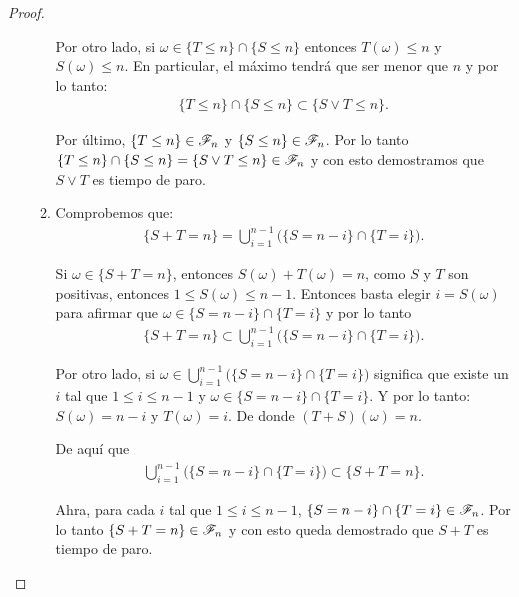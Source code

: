 \begin{proof}
\begin{enumerate}
\begin{enumerate}
							Por otro lado, si $\omega \in \{ T \leq n \} \cap \{ S \leq n\}$ entonces $T(\omega) \leq n$ y $S(\omega) \leq n$.
							En particular, el máximo tendrá que ser menor que $n$ y por lo tanto:
							\begin{align}
		                			\{ T \leq n \} \cap \{ S \leq n\} \subset \{ S \vee T \leq n \}.						
							\end{align}
							
							Por último, $\{ T \leq n \} \in \mathscr{F}_n$ y $\{ S \leq n \} \in \mathscr{F}_n$. Por lo tanto	\\	
							$\{ T \leq n \} \cap \{ S \leq n\} = \{ S \vee T \leq n \} \in \mathscr{F}_n$ y con esto demostramos que 
							$ S \vee T$ es tiempo de paro.\\
							
						\item
							Comprobemos que:
							\begin{align}
								\{ S + T = n \} = \bigcup_{i = 1}^{n-1} \bigg( \{S = n - i\} \cap \{T = i\} \bigg).
							\end{align}
							
							Si $\omega \in \{ S + T = n \}$, entonces $S(\omega) + T(\omega) = n$, como $S$ y $T$ son positivas,
							entonces $1 \leq S(\omega) \leq n-1$. Entonces basta elegir $i = S(\omega)$ para afirmar que 
							$\omega \in \{S = n - i\} \cap \{T = i\}$ y por lo tanto
							\begin{align}
							\{ S + T = n \} \subset \bigcup_{i = 1}^{n-1} \bigg( \{S = n - i\} \cap \{T = i\} \bigg).
							\end{align}
							
							Por otro lado, si $\omega \in \bigcup_{i = 1}^{n-1} \bigg( \{S = n - i\} \cap \{T = i\} \bigg)$
							significa que existe un $i$ tal que $1\leq i \leq n-1$ y $\omega \in \{S = n - i\} \cap \{T = i\}$.
							Y por lo tanto: $S(\omega) = n-i$ y $T(\omega) = i$. De donde $(T + S)(\omega) = n$.
							
							De aquí que
							\begin{align}
								\bigcup_{i = 1}^{n-1} \bigg( \{S = n - i\} \cap \{T = i\} \bigg) \subset \{ S + T = n \}. 
							\end{align}
							
							Ahra, para cada $i$ tal que $1 \leq i \leq n-1$, $\{S = n - i\} \cap \{T = i\} \in \mathscr{F}_n$.
							Por lo tanto $\{ S + T = n\} \in \mathscr{F}_n$ y con esto queda demostrado que $ S + T $ es tiempo de paro.
                	\end{enumerate}
                	

\end{enumerate}
\end{proof}

